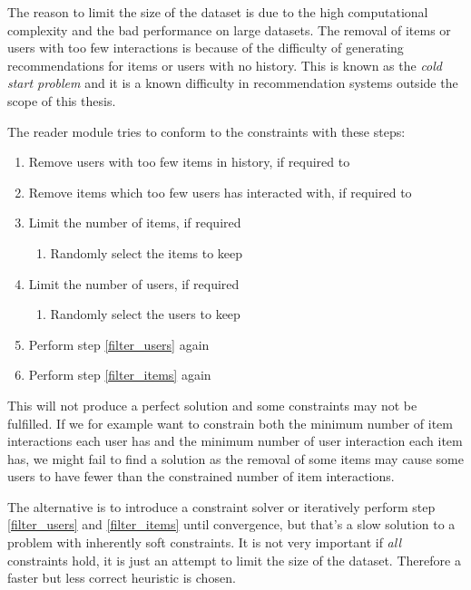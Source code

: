 The reason to limit the size of the dataset is due to the high computational complexity and the bad performance on large datasets. The removal of items or users with too few interactions is because of the difficulty of generating recommendations for items or users with no history. This is known as the \textit{cold start problem} and it is a known difficulty in recommendation systems \citep{cacheda2011comparison} outside the scope of this thesis.

The reader module tries to conform to the constraints with these steps:

\begin{enumerate}
    \item \label{filter_users} Remove users with too few items in history, if required to
    \item \label{filter_items} Remove items which too few users has interacted with, if required to

    \item Limit the number of items, if required
        \begin{enumerate}
            \item Randomly select the items to keep
        \end{enumerate}
    \item Limit the number of users, if required
        \begin{enumerate}
            \item Randomly select the users to keep
        \end{enumerate}

    \item Perform step \ref{filter_users} again
    \item Perform step \ref{filter_items} again
\end{enumerate}

This will not produce a perfect solution and some constraints may not be fulfilled. If we for example want to constrain both the minimum number of item interactions each user has and the minimum number of user interaction each item has, we might fail to find a solution as the removal of some items may cause some users to have fewer than the constrained number of item interactions.

The alternative is to introduce a constraint solver or iteratively perform step \ref{filter_users} and \ref{filter_items} until convergence, but that's a slow solution to a problem with inherently soft constraints. It is not very important if \textit{all} constraints hold, it is just an attempt to limit the size of the dataset. Therefore a faster but less correct heuristic is chosen.

